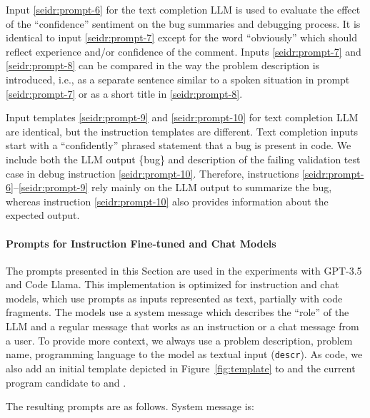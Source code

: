 Input \ref{seidr:prompt-6} for the text completion LLM is used to evaluate the effect of the ``confidence'' sentiment on the bug summaries and debugging process. 
It is identical to input \ref{seidr:prompt-7} except for the word ``obviously'' which should reflect experience and/or confidence of the comment. 
Inputs \ref{seidr:prompt-7} and \ref{seidr:prompt-8} can be compared in the way the problem description is introduced, i.e., as a separate sentence similar to a spoken situation in prompt \ref{seidr:prompt-7} or as a short title in \ref{seidr:prompt-8}.

Input templates \ref{seidr:prompt-9} and \ref{seidr:prompt-10} for text completion LLM are identical, but the instruction templates are different.
Text completion inputs start with a ``confidently'' phrased statement that a bug is present in code.  
We include both the LLM output \{bug\} and description of the failing validation test case in debug instruction \ref{seidr:prompt-10}.
Therefore, instructions \ref{seidr:prompt-6}--\ref{seidr:prompt-9} rely mainly on the LLM output to summarize the bug, whereas instruction \ref{seidr:prompt-10} also provides information about the expected output. 


\paragraph{Prompts for Instruction Fine-tuned and Chat Models}
\label{sec:seidr-ollama-prompts}

The prompts presented in this Section are used in the experiments with GPT-3.5 and Code Llama.
This implementation is optimized for instruction and chat models, which use prompts as inputs represented as text, partially with code fragments.
The models use a system message which describes the ``role'' of the LLM and a regular message that works as an instruction or a chat message from a user.
To provide more context, we always use a problem description, problem name, programming language to the model as textual input (\texttt{descr}). 
As code, we also add an initial template depicted in Figure~\ref{fig:template} to \synthmodel{} and the current program candidate to \textmodel{} and \debugmodel{}.

The resulting prompts are as follows.
System message is: \newline
     \newline
    \newline

